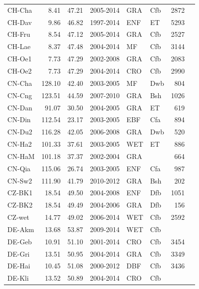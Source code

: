 \documentclass{myreport}
\begin{document}
\begin{longtable}{lrrlllrl}
 CH-Cha & 8.41 & 47.21 & 2005-2014 & GRA & Cfb & 2872 & \cite{CH-Cha} \\ 
 CH-Dav & 9.86 & 46.82 & 1997-2014 & ENF & ET & 5293 & \cite{CH-Dav} \\ 
 CH-Fru & 8.54 & 47.12 & 2005-2014 & GRA & Cfb & 2527 & \cite{CH-Fru} \\ 
 CH-Lae & 8.37 & 47.48 & 2004-2014 & MF & Cfb & 3144 & \cite{CH-Lae} \\ 
 CH-Oe1 & 7.73 & 47.29 & 2002-2008 & GRA & Cfb & 2083 & \cite{CH-Oe1} \\ 
 CH-Oe2 & 7.73 & 47.29 & 2004-2014 & CRO & Cfb & 2990 & \cite{CH-Oe2} \\ 
 CN-Cha & 128.10 & 42.40 & 2003-2005 & MF & Dwb & 804 & \cite{CN-Cha} \\ 
 CN-Cng & 123.51 & 44.59 & 2007-2010 & GRA & Bsh & 1026 & \cite{CN-Cng} \\ 
 CN-Dan & 91.07 & 30.50 & 2004-2005 & GRA & ET & 619 & \cite{CN-Dan} \\ 
 CN-Din & 112.54 & 23.17 & 2003-2005 & EBF & Cfa & 894 & \cite{CN-Din} \\ 
 CN-Du2 & 116.28 & 42.05 & 2006-2008 & GRA & Dwb & 520 & \cite{CN-Du2} \\ 
 CN-Ha2 & 101.33 & 37.61 & 2003-2005 & WET & ET & 886 & \cite{CN-Ha2} \\ 
 CN-HaM & 101.18 & 37.37 & 2002-2004 & GRA &  & 664 & \cite{CN-HaM} \\ 
 CN-Qia & 115.06 & 26.74 & 2003-2005 & ENF & Cfa & 987 & \cite{CN-Qia} \\ 
 CN-Sw2 & 111.90 & 41.79 & 2010-2012 & GRA & Bsh & 202 & \cite{CN-Sw2} \\ 
 CZ-BK1 & 18.54 & 49.50 & 2004-2008 & ENF & Dfb & 1051 & \cite{CZ-BK1} \\ 
 CZ-BK2 & 18.54 & 49.49 & 2004-2006 & GRA & Dfb & 156 & \cite{CZ-BK2} \\ 
 CZ-wet & 14.77 & 49.02 & 2006-2014 & WET & Cfb & 2592 & \cite{CZ-wet} \\ 
 DE-Akm & 13.68 & 53.87 & 2009-2014 & WET & Cfb &  & \cite{DE-Akm} \\ 
 DE-Geb & 10.91 & 51.10 & 2001-2014 & CRO & Cfb & 3454 & \cite{DE-Geb} \\ 
 DE-Gri & 13.51 & 50.95 & 2004-2014 & GRA & Cfb & 3349 & \cite{DE-Gri} \\ 
 DE-Hai & 10.45 & 51.08 & 2000-2012 & DBF & Cfb & 3436 & \cite{DE-Hai} \\ 
 DE-Kli & 13.52 & 50.89 & 2004-2014 & CRO & Cfb &  & \cite{DE-Kli} \\ 

\end{longtable}
\end{document}
